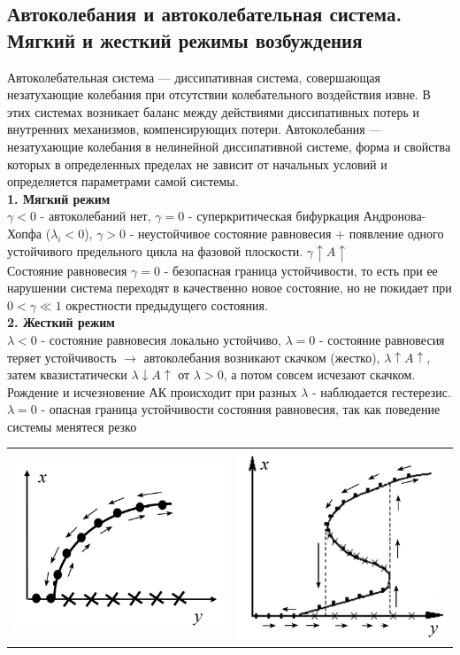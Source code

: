 \begin{multicols*}{2}
		
		\section{Автоколебания и автоколебательная система. Мягкий и жесткий режимы возбуждения}
		Автоколебательная система — диссипативная система, совершающая незатухающие колебания при отсутствии колебательного воздействия извне. В этих системах возникает баланс между действиями диссипативных потерь и внутренних механизмов, компенсирующих потери. Автоколебания — незатухающие колебания в нелинейной диссипативной системе, форма и свойства которых в определенных пределах не зависит от начальных условий и определяется параметрами самой системы.\\
		\textbf{1. Мягкий режим\\}
		$\gamma < 0$ - автоколебаний нет, $\gamma = 0$ - суперкритическая бифуркация Андронова-Хопфа ($\lambda_i < 0$), $\gamma > 0$ - неустойчивое состояние равновесия + появление одного устойчивого предельного цикла на фазовой плоскости. \quad $\gamma \uparrow A \uparrow$\\
		Состояние равновесия $\gamma = 0$ - безопасная граница устойчивости, то есть при ее нарушении система переходят в качественно новое состояние, но не покидает при $0<\gamma \ll 1$ окрестности предыдущего состояния.\\
		\textbf{2. Жесткий режим\\}
		$\lambda< 0$ - состояние равновесия локально устойчиво, $\lambda = 0$ - состояние равновесия теряет устойчивость $\rightarrow$ автоколебания возникают скачком (жестко), $\lambda \uparrow A \uparrow$, затем квазистатически $\lambda \downarrow A \uparrow$ от $\lambda > 0$, а потом совсем исчезают скачком. Рождение и исчезновение АК происходит при разных $\lambda$ - наблюдается гестерезис. $\lambda = 0$ - опасная граница устойчивости состояния равновесия, так как поведение системы менятеся резко\\
		\begin{tabular}{c c}
			\includegraphics[width=0.40\linewidth]{tk_img/avtokoleb_1.png} & \includegraphics[width=0.35\linewidth]{tk_img/avtokoleb_2.png}
		\end{tabular}\\
		

\end{multicols*}
